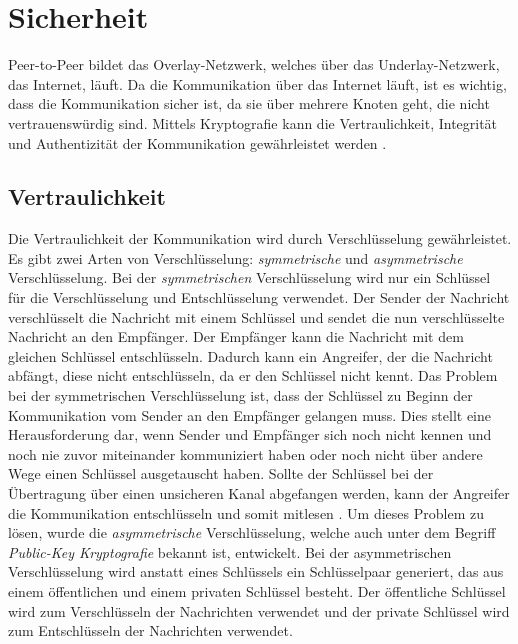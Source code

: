 \section{Sicherheit}
\label{sec:sicherheit_basics}

Peer-to-Peer bildet das Overlay-Netzwerk, welches über das Underlay-Netzwerk, das Internet, läuft. Da die Kommunikation über das Internet läuft, ist es wichtig, dass die Kommunikation sicher ist, da sie über mehrere Knoten geht, die nicht vertrauenswürdig sind. Mittels Kryptografie kann die Vertraulichkeit, Integrität und Authentizität der Kommunikation gewährleistet werden \Parencite[S. 7]{Hellmann_IT-Sicherheit}. 

\subsection{Vertraulichkeit}

Die Vertraulichkeit der Kommunikation wird durch Verschlüsselung gewährleistet. Es gibt zwei Arten von Verschlüsselung: \textit{symmetrische} und \textit{asymmetrische} Verschlüsselung. Bei der \textit{symmetrischen} Verschlüsselung wird nur ein Schlüssel für die Verschlüsselung und Entschlüsselung verwendet. Der Sender der Nachricht verschlüsselt die Nachricht mit einem Schlüssel und sendet die nun verschlüsselte Nachricht an den Empfänger. Der Empfänger kann die Nachricht mit dem gleichen Schlüssel entschlüsseln. Dadurch kann ein Angreifer, der die Nachricht abfängt, diese nicht entschlüsseln, da er den Schlüssel nicht kennt. Das Problem bei der symmetrischen Verschlüsselung ist, dass der Schlüssel zu Beginn der Kommunikation vom Sender an den Empfänger gelangen muss. Dies stellt eine Herausforderung dar, wenn Sender und Empfänger sich noch nicht kennen und noch nie zuvor miteinander kommuniziert haben oder noch nicht über andere Wege einen Schlüssel ausgetauscht haben. Sollte der Schlüssel bei der Übertragung über einen unsicheren Kanal abgefangen werden, kann der Angreifer die Kommunikation entschlüsseln und somit mitlesen \Parencites[S. 644]{DiffieHellman_NewDirectionsInCryptography}[S. 5-8]{Wong_KryptoPraxis}. Um dieses Problem zu lösen, wurde die \textit{asymmetrische} Verschlüsselung, welche auch unter dem Begriff \textit{Public-Key Kryptografie} bekannt ist, entwickelt. Bei der asymmetrischen Verschlüsselung wird anstatt eines Schlüssels ein Schlüsselpaar generiert, das aus einem öffentlichen und einem privaten Schlüssel besteht. Der öffentliche Schlüssel wird zum Verschlüsseln der Nachrichten verwendet und der private Schlüssel wird zum Entschlüsseln der Nachrichten verwendet. 

